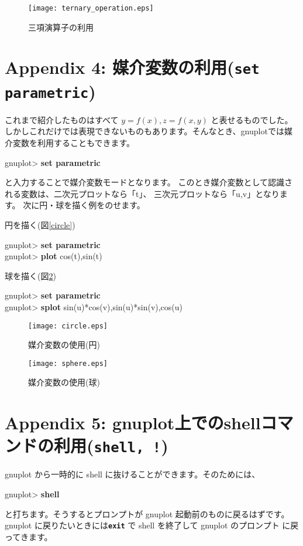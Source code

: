 \documentclass[a4j]{ujarticle} %
\newenvironment{terminal}{%
  \begin{center}
   \begin{minipage}{.8\textwidth}
    \setlength{\FrameSep}{.5\FrameSep}%
    \begin{framed}\ttfamily\small%
     \setlength\baselineskip{.85\baselineskip}%
}{%
    \end{framed}
   \end{minipage}
  \end{center}%
}
\begin{document}
\begin{figure}
\begin{center}
\begin{minipage}[hbtp]{0.49\textwidth}
 \texttt{[image: ternary\_operation.eps]}
 \caption{三項演算子の利用}
\label{ternary}
\end{minipage}
\end{center}
\end{figure}

\section*{Appendix 4:  媒介変数の利用({\tt\bf set parametric})}
これまで紹介したものはすべて $y=f(x),z=f(x,y)$ と表せるものでした。
しかしこれだけでは表現できないものもあります。そんなとき、gnuplotでは媒介変数を利用することもできます。
\begin{terminal}
 gnuplot> {\bf set parametric}
\end{terminal}
と入力することで媒介変数モードとなります。
このとき媒介変数として認識される変数は、二次元プロットなら「t」、
三次元プロットなら「u,v」となります。
次に円・球を描く例をのせます。

円を描く(図\ref{circle})
\begin{terminal}
 gnuplot> {\bf set parametric}\\
 gnuplot> {\bf plot} cos(t),sin(t)
\end{terminal}

球を描く(図\ref{sphere})
\begin{terminal}
 gnuplot> {\bf set parametric}\\
 gnuplot> {\bf splot} sin(u)*cos(v),sin(u)*sin(v),cos(u)
\end{terminal}

\begin{figure}
 \begin{center}
  \begin{minipage}[hbtp]{0.49\textwidth}
   \texttt{[image: circle.eps]}
   \caption{媒介変数の使用(円)}
   \label{circle}
  \end{minipage}
  \begin{minipage}[hbtp]{0.49\textwidth}
   \texttt{[image: sphere.eps]}
   \caption{媒介変数の使用(球)}
   \label{sphere}
  \end{minipage}
 \end{center}
\end{figure}

\section*{Appendix 5:  gnuplot上でのshellコマンドの利用({\tt\bf shell, !})}
gnuplot から一時的に shell に抜けることができます。そのためには、
\begin{terminal}
 gnuplot> {\bf shell}
\end{terminal}
と打ちます。そうするとプロンプトが gnuplot 起動前のものに戻るはずです。
gnuplot に戻りたいときには{\tt\bf exit} で shell を終了して gnuplot のプロンプト
に戻ってきます。
\end{document}
